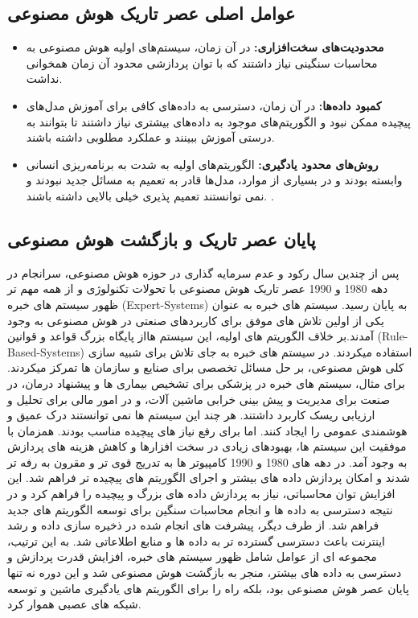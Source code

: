 \subsection{عوامل اصلی عصر تاریک هوش مصنوعی}
\begin{itemize}
	\item \textbf{محدودیت‌های سخت‌افزاری:}
در آن زمان، سیستم‌های اولیه هوش مصنوعی  به محاسبات سنگینی نیاز داشتند که با توان پردازشی محدود آن زمان همخوانی نداشت.
	
	\item \textbf{کمبود داده‌ها:}
 در آن زمان، دسترسی به داده‌های کافی برای آموزش مدل‌های پیچیده ممکن نبود و الگوریتم‌های موجود به داده‌های بیشتری نیاز داشتند تا بتوانند به درستی آموزش ببینند و عملکرد مطلوبی داشته باشند.
	
	\item \textbf{روش‌های محدود یادگیری:} 
الگوریتم‌های اولیه به شدت به برنامه‌ریزی انسانی وابسته بودند و در بسیاری از موارد، مدل‌ها قادر به تعمیم به مسائل جدید نبودند و نمی توانستند تعمیم پذیری خیلی بالایی داشته باشند. \cite{russell2016artificial}.
	\end{itemize}

\subsection{پایان عصر تاریک و بازگشت هوش مصنوعی}
پس از چندین سال رکود و عدم سرمایه گذاری در حوزه هوش مصنوعی، سرانجام در دهه 1980 و 1990  عصر تاریک هوش مصنوعی با تحولات تکنولوژی و از همه مهم تر ظهور سیستم های خبره
(Expert-Systems)
به پایان رسید.
سیستم های خبره به عنوان یکی از اولین تلاش های موفق برای کاربردهای صنعتی در هوش مصنوعی به وجود آمدند.بر خلاف الگوریتم های اولیه، این سیستم هااز پایگاه بزرگ قواعد و قوانین 
(Rule-Based-Systems) 
استفاده میکردند. 
در سیستم های خبره به جای تلاش برای شبیه سازی کلی هوش مصنوعی، بر حل مسائل تخصصی برای صنایع و سازمان ها تمرکز میکردند. برای مثال، سیستم های خبره در پزشکی برای تشخیص بیماری ها و پیشنهاد درمان، در صنعت برای مدیریت و پیش بینی خرابی ماشین آلات، و در امور مالی برای تحلیل و ارزیابی ریسک کاربرد داشتند.
هر چند این سیستم ها نمی توانستند درک عمیق و هوشمندی عمومی را ایجاد کنند. اما برای رفع نیاز های پیچیده مناسب بودند.
همزمان با موفقیت این سیستم ها، بهبودهای زیادی در سخت افزارها و کاهش هزینه های پردازش به وجود آمد. در دهه های 1980  و 1990 کامپیوتر ها به تدریج قوی تر و مقرون به رفه تر شدند و امکان پردازش داده های بیشتر و اجرای الگوریتم های پیچیده تر فراهم شد.
این افزایش توان محاسباتی، نیاز به پردازش داده های بزرگ و پیچیده را فراهم کرد و در نتیجه دسترسی به داده ها و انجام محاسبات سنگین برای توسعه الگوریتم های جدید فراهم شد.
از طرف دیگر، پیشرفت های انجام شده در ذخیره سازی داده و رشد اینترنت باعث دسترسی گسترده تر به داده ها و منابع اطلاعاتی شد.
به این ترتیب، مجموعه ای از عوامل شامل ظهور سیستم های خبره، افزایش قدرت پردازش و دسترسی به داده های بیشتر، منجر به بازگشت هوش مصنوعی شد و این دوره نه تنها پایان عصر هوش مصنوعی بود، بلکه راه را برای الگوریتم های یادگیری ماشین و توسعه شبکه های عصبی هموار کرد. \cite{(McCorduck, 2004; Russell & Norvig, 2016).}



